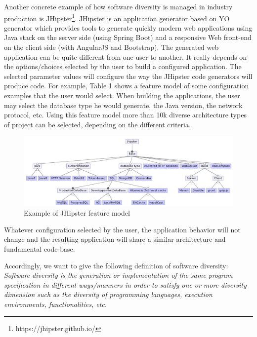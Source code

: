 Another concrete example of how software diversity is managed in industry production is JHipster\footnote{https://jhipster.github.io/}. JHipster is an application generator based on YO generator which provides tools to generate quickly modern web applications using Java stack on the server side (using Spring Boot) and a responsive Web front-end on the client side (with AngularJS and Bootstrap).
The generated web application can be quite different from one user to another. It really depends on the options/choices selected by the user to build a configured application. The selected parameter values will configure the way the JHipster code generators will produce code. 
For example, Table 1 shows a feature model of some configuration examples that the user would select. When building the applications, the user may select the database type he would generate, the Java version, the network protocol, etc. 
Using this feature model more than 10k diverse architecture types of project can be selected, depending on the different criteria.
\begin{figure}[h]
	\center
	\includegraphics[scale=0.65]{Background/fig/jhipster}
	\caption{Example of JHipster feature model}
\end{figure}

Whatever configuration selected by the user, the application behavior will not change and the resulting application will share a similar architecture and fundamental code-base.

Accordingly, we want to give the following definition of software diversity: 
\textit{Software diversity is the generation or implementation of the same program specification in different ways/manners in order to satisfy one or more diversity dimension such as the diversity of programming languages, execution environments, functionalities, etc.}



